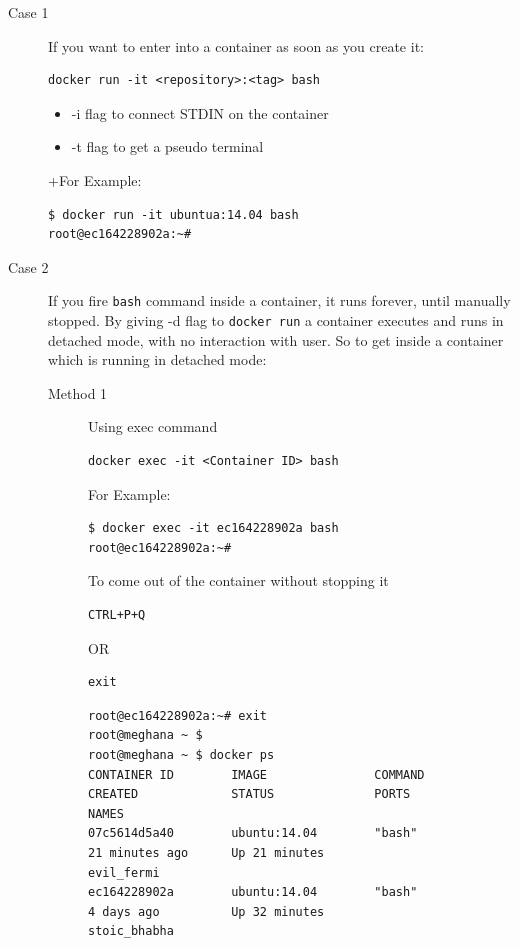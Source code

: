 \documentclass[11pt]{article}
\begin{document}
\begin{description}
\item[{Case 1}] If you want to enter into a container as soon as you create it:
\begin{verbatim}
docker run -it <repository>:<tag> bash
\end{verbatim}
\begin{itemize}
\item -i flag to connect STDIN on the container
\item -t flag to get a pseudo terminal
\end{itemize}
+For Example:
\begin{verbatim}
$ docker run -it ubuntua:14.04 bash
root@ec164228902a:~#
\end{verbatim}

\item[{Case 2}] If you fire \texttt{bash} command inside a container, it runs forever, until
manually stopped. By giving -d flag to \texttt{docker run}  a container executes
and runs in detached mode, with no interaction with user. So to get inside a
container which is running in detached mode:
\begin{description}
\item[{Method 1}] Using exec command
\begin{verbatim}
docker exec -it <Container ID> bash
\end{verbatim}
For Example:
\begin{verbatim}
$ docker exec -it ec164228902a bash
root@ec164228902a:~#
\end{verbatim}
\begin{description}
\item[{To come out of the container without stopping it}] 
\end{description}
\begin{verbatim}
CTRL+P+Q
\end{verbatim}
OR
\begin{verbatim}
exit
\end{verbatim}
\begin{verbatim}
root@ec164228902a:~# exit
root@meghana ~ $
root@meghana ~ $ docker ps
CONTAINER ID        IMAGE               COMMAND             CREATED             STATUS              PORTS               NAMES
07c5614d5a40        ubuntu:14.04        "bash"              21 minutes ago      Up 21 minutes                           evil_fermi
ec164228902a        ubuntu:14.04        "bash"              4 days ago          Up 32 minutes                           stoic_bhabha
\end{verbatim}


\end{description}
\end{description}
\end{document}
